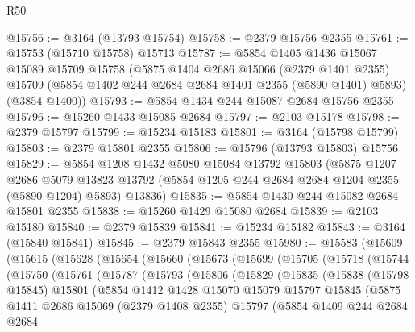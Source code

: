 \begin{lexlean}{R50}
\begin{coremodule}
@15756 := @3164 (@13793 @15754)
@15758 := @2379 @15756 @2355
@15761 := @15753 (@15710 @15758) @15713
@15787 := @5854
    @1405
    @1436
    @15067
    @15089
    @15709
    @15758
    (@5875
      @1404
      @2686
      @15066
      (@2379 @1401 @2355)
      @15709
      (@5854 @1402 @244 @2684 @2684 @1401 @2355 (@5890 @1401) @5893)
      (@3854 @1400))
@15793 := @5854 @1434 @244 @15087 @2684 @15756 @2355
@15796 := @15260 @1433 @15085 @2684
@15797 := @2103 @15178
@15798 := @2379 @15797
@15799 := @15234 @15183
@15801 := @3164 (@15798 @15799)
@15803 := @2379 @15801 @2355
@15806 := @15796 (@13793 @15803) @15756
@15829 := @5854
    @1208
    @1432
    @5080
    @15084
    @13792
    @15803
    (@5875
      @1207
      @2686
      @5079
      @13823
      @13792
      (@5854 @1205 @244 @2684 @2684 @1204 @2355 (@5890 @1204) @5893)
      @13836)
@15835 := @5854 @1430 @244 @15082 @2684 @15801 @2355
@15838 := @15260 @1429 @15080 @2684
@15839 := @2103 @15180
@15840 := @2379 @15839
@15841 := @15234 @15182
@15843 := @3164 (@15840 @15841)
@15845 := @2379 @15843 @2355
@15980 := @15583
    (@15609
      (@15615
        (@15628
          (@15654
            (@15660
              (@15673
                (@15699
                  (@15705
                    (@15718
                      (@15744
                        (@15750
                          (@15761
                            (@15787
                              (@15793
                                (@15806
                                  (@15829
                                    (@15835
                                      (@15838
                                        (@15798 @15845)
                                        @15801
                                        (@5854
                                          @1412
                                          @1428
                                          @15070
                                          @15079
                                          @15797
                                          @15845
                                          (@5875
                                            @1411
                                            @2686
                                            @15069
                                            (@2379 @1408 @2355)
                                            @15797
                                            (@5854
                                              @1409
                                              @244
                                              @2684
                                              @2684

\end{coremodule}
\end{lexlean}
